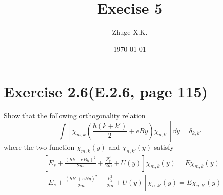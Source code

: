 \documentclass[11pt,a4paper]{article}
\title{Execise 5}
\author{Zhuge X.K.}
\date{\today}
\theoremstyle{plain}
\theoremstyle{definition}
\theoremstyle{remark}
\begin{document}
\maketitle
\section*{Exercise 2.6(E.2.6, page 115)}
Show that the following orthogonality relation
\begin{equation*}
    \int \left[ \chi_{m,k} \left( \frac{\hbar(k+k')}{2} + eBy \right) \chi_{n,k'} \right] \dd y = \delta_{k,k'}
\end{equation*}
where the two function $\chi_{m,k}(y)$ and $\chi_{n,k'}(y)$ satisfy
\begin{equation*}
    \begin{aligned}
        & \left[ E_s + \frac{(\hbar k + eBy)^2}{2 m} + \frac{p_y^2}{2m} + U(y) \right] \chi_{m,k}(y) = E\chi_{m,k}(y) \\
        & \left[ E_s + \frac{(\hbar k' + eBy)^2}{2 m} + \frac{p_y^2}{2m} + U(y) \right] \chi_{n,k'}(y) = E\chi_{n,k'}(y)
    \end{aligned}
\end{equation*}
\end{document}

